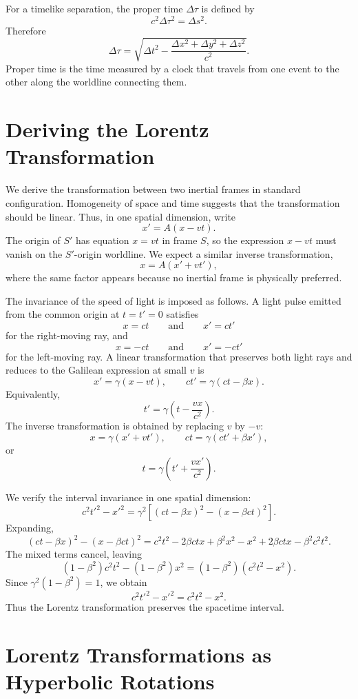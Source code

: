 For a timelike separation, the proper time \(\Delta\tau\) is defined by
\[
c^2\Delta\tau^2=\Delta s^2.
\]
Therefore
\[
\Delta\tau=\sqrt{\Delta t^2-\frac{\Delta x^2+\Delta y^2+\Delta z^2}{c^2}}.
\]
Proper time is the time measured by a clock that travels from one event to the
other along the worldline connecting them.

\clearpage

\section{Deriving the Lorentz Transformation}

We derive the transformation between two inertial frames in standard
configuration. Homogeneity of space and time suggests that the transformation
should be linear. Thus, in one spatial dimension, write
\[
x'=A(x-vt).
\]
The origin of \(S'\) has equation \(x=vt\) in frame \(S\), so the expression
\(x-vt\) must vanish on the \(S'\)-origin worldline. We expect a similar inverse
transformation,
\[
x=A(x'+vt'),
\]
where the same factor appears because no inertial frame is physically preferred.

The invariance of the speed of light is imposed as follows. A light pulse
emitted from the common origin at \(t=t'=0\) satisfies
\[
x=ct
\qquad\text{and}\qquad
x'=ct'
\]
for the right-moving ray, and
\[
x=-ct
\qquad\text{and}\qquad
x'=-ct'
\]
for the left-moving ray. A linear transformation that preserves both light rays
and reduces to the Galilean expression at small \(v\) is
\[
x'=\gamma(x-vt),
\qquad
ct'=\gamma\left(ct-\beta x\right).
\]
Equivalently,
\[
t'=\gamma\left(t-\frac{vx}{c^2}\right).
\]
The inverse transformation is obtained by replacing \(v\) by \(-v\):
\[
x=\gamma(x'+vt'),
\qquad
ct=\gamma\left(ct'+\beta x'\right),
\]
or
\[
t=\gamma\left(t'+\frac{vx'}{c^2}\right).
\]

We verify the interval invariance in one spatial dimension:
\[
c^2t'^2-x'^2
=\gamma^2\left[(ct-\beta x)^2-(x-\beta ct)^2\right].
\]
Expanding,
\[
(ct-\beta x)^2-(x-\beta ct)^2
=c^2t^2-2\beta ctx+\beta^2x^2-x^2+2\beta ctx-\beta^2c^2t^2.
\]
The mixed terms cancel, leaving
\[
(1-\beta^2)c^2t^2-(1-\beta^2)x^2
=(1-\beta^2)(c^2t^2-x^2).
\]
Since \(\gamma^2(1-\beta^2)=1\), we obtain
\[
c^2t'^2-x'^2=c^2t^2-x^2.
\]
Thus the Lorentz transformation preserves the spacetime interval.

\clearpage

\section{Lorentz Transformations as Hyperbolic Rotations}

